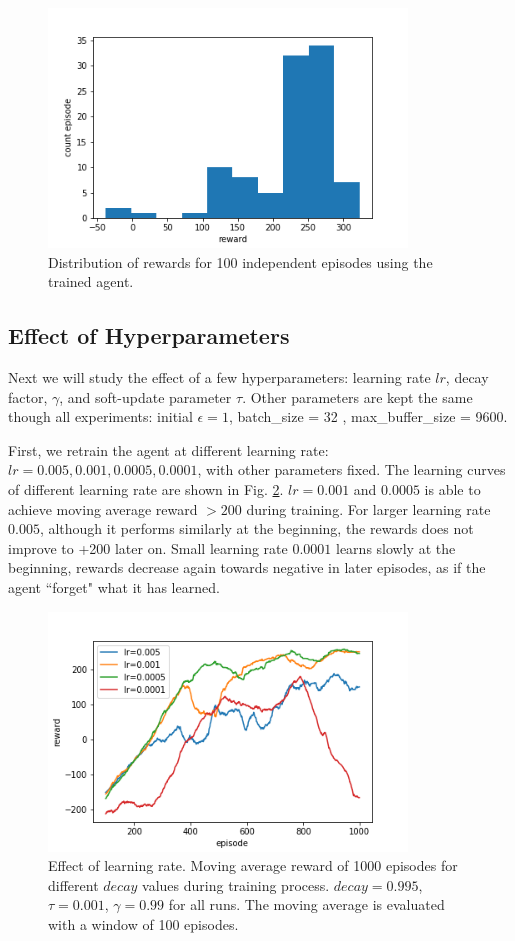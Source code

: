 \documentclass[conference]{IEEEtran}
\begin{document}
\begin{figure}
\includegraphics[height=2.5in]{figures/test_reward_dist.png} 
\caption{Distribution of rewards for 100 independent episodes using the trained agent.}
\label{fig:test_r}
\end{figure}

\subsection{Effect of Hyperparameters}
Next we will study the effect of a few hyperparameters: learning rate $lr$, decay factor, $\gamma$, and soft-update parameter $\tau$. Other parameters are kept the same though all experiments: initial $\epsilon=1$, batch\_size = 32 , max\_buffer\_size = 9600.

First, we retrain the agent at different learning rate: $lr = 0.005, 0.001, 0.0005, 0.0001$, with other parameters fixed. The learning curves of different learning rate are shown in Fig. \ref{fig:lr}. $lr = 0.001$ and $0.0005$ is able to achieve moving average reward $>200$ during training. For larger learning rate $0.005$, although it performs similarly at the beginning, the rewards does not improve to +200 later on. Small learning rate $0.0001$ learns slowly at the beginning, rewards decrease again towards negative in later episodes, as if the agent ``forget" what it has learned. 

	\begin{figure}
		\includegraphics[height=2.5in]{figures/lr.png} 
		\caption{Effect of learning rate. Moving average reward of 1000 episodes for different $decay$ values during training process. $decay=0.995$, $\tau=0.001$, $\gamma=0.99$ for all runs. The moving average is evaluated with a window of 100 episodes.}
		\label{fig:lr}
	\end{figure}
\end{document}
